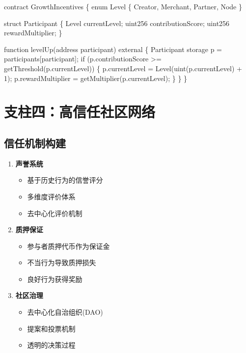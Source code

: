 \documentclass[
  Letterpaper,
]{scrbook}
\newenvironment{Shaded}{\begin{snugshade}}{\end{snugshade}}
\newcommand{\NormalTok}[1]{\textcolor[rgb]{0.00,0.23,0.31}{#1}}
\providecommand{\tightlist}{%
  \setlength{\itemsep}{0pt}\setlength{\parskip}{0pt}}
\begin{document}
\begin{Shaded}
\begin{Highlighting}[]
\NormalTok{contract GrowthIncentives \{}
\NormalTok{    enum Level \{ Creator, Merchant, Partner, Node \}}
    
\NormalTok{    struct Participant \{}
\NormalTok{        Level currentLevel;}
\NormalTok{        uint256 contributionScore;}
\NormalTok{        uint256 rewardMultiplier;}
\NormalTok{    \}}
    
\NormalTok{    function levelUp(address participant) external \{}
\NormalTok{        Participant storage p = participants[participant];}
\NormalTok{        if (p.contributionScore \textgreater{}= getThreshold(p.currentLevel)) \{}
\NormalTok{            p.currentLevel = Level(uint(p.currentLevel) + 1);}
\NormalTok{            p.rewardMultiplier = getMultiplier(p.currentLevel);}
\NormalTok{        \}}
\NormalTok{    \}}
\NormalTok{\}}
\end{Highlighting}
\end{Shaded}

\section{支柱四：高信任社区网络}\label{ux652fux67f1ux56dbux9ad8ux4fe1ux4efbux793eux533aux7f51ux7edc}

\subsection{信任机制构建}\label{ux4fe1ux4efbux673aux5236ux6784ux5efa}

\begin{enumerate}
\def\labelenumi{\arabic{enumi}.}
\tightlist
\item
  \textbf{声誉系统}

  \begin{itemize}
  \tightlist
  \item
    基于历史行为的信誉评分
  \item
    多维度评价体系
  \item
    去中心化评价机制
  \end{itemize}
\item
  \textbf{质押保证}

  \begin{itemize}
  \tightlist
  \item
    参与者质押代币作为保证金
  \item
    不当行为导致质押损失
  \item
    良好行为获得奖励
  \end{itemize}
\item
  \textbf{社区治理}

  \begin{itemize}
  \tightlist
  \item
    去中心化自治组织(DAO)
  \item
    提案和投票机制
  \item
    透明的决策过程
  \end{itemize}
\end{enumerate}
\end{document}
